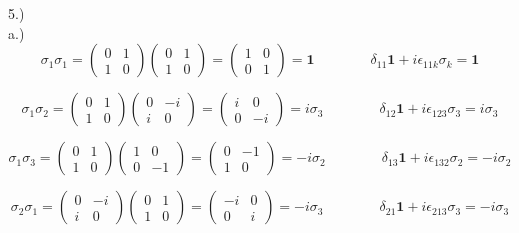 \documentclass[12pt]{article}
\begin{document}
5.) \\
a.)
$$\sigma_1 \sigma_1 = \begin{pmatrix} 0 & 1 \\ 1 & 0 \end{pmatrix} \begin{pmatrix} 0 & 1 \\ 1 & 0 \end{pmatrix} = \begin{pmatrix} 1 & 0 \\ 0 & 1 \end{pmatrix} = \textbf{1} \qquad \qquad \delta_{11}\textbf{1} + i \epsilon_{11k} \sigma_k = \textbf{1}$$

$$\sigma_1 \sigma_2 = \begin{pmatrix} 0 & 1 \\ 1 & 0 \end{pmatrix} \begin{pmatrix} 0 & -i \\ i & 0 \end{pmatrix} = \begin{pmatrix} i & 0 \\ 0 & -i \end{pmatrix} = i \sigma_3 \qquad \qquad \delta_{12}\textbf{1} + i \epsilon_{123} \sigma_3 = i \sigma_3$$

$$\sigma_1 \sigma_3 = \begin{pmatrix} 0 & 1 \\ 1 & 0 \end{pmatrix} \begin{pmatrix} 1 & 0 \\ 0 & -1 \end{pmatrix} = \begin{pmatrix} 0 & -1 \\ 1 & 0 \end{pmatrix} = -i \sigma_2 \qquad \qquad \delta_{13}\textbf{1} + i \epsilon_{132} \sigma_2 = -i \sigma_2$$

$$\sigma_2 \sigma_1 = \begin{pmatrix} 0 & -i \\ i & 0 \end{pmatrix} \begin{pmatrix} 0 & 1 \\ 1 & 0 \end{pmatrix} = \begin{pmatrix} -i & 0 \\ 0 & i \end{pmatrix} = -i \sigma_3 \qquad \qquad \delta_{21}\textbf{1} + i \epsilon_{213} \sigma_3 = -i \sigma_3$$
\end{document}
